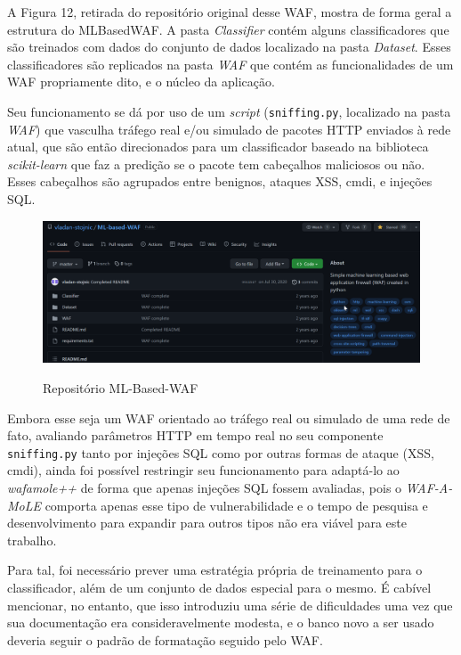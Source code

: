 A Figura 12, retirada do repositório original desse WAF, mostra de forma geral a estrutura do MLBasedWAF. A pasta \textit{Classifier} contém alguns classificadores que são treinados com dados do conjunto de dados localizado na pasta \textit{Dataset}. Esses classificadores são replicados na pasta \textit{WAF} que contém as funcionalidades de um WAF propriamente dito, e o núcleo da aplicação.

Seu funcionamento se dá por uso de um \textit{script} (\verb+sniffing.py+, localizado na pasta \textit{WAF}) que vasculha tráfego real e/ou simulado de pacotes HTTP enviados à rede atual, que são então direcionados para um classificador baseado na biblioteca \textit{scikit-learn} que faz a predição se o pacote tem cabeçalhos maliciosos ou não. Esses cabeçalhos são agrupados entre benignos, ataques XSS, cmdi, e injeções SQL.

\begin{figure}[ht]
    \centering
    \caption{Repositório ML-Based-WAF}
    \includegraphics[width=16cm]{figuras/MLBasedWAF.png} 
    \label{fig:internet} 
\end{figure}

Embora esse seja um WAF orientado ao tráfego real ou simulado de uma rede de fato, avaliando parâmetros HTTP em tempo real no seu componente \verb+sniffing.py+ tanto por injeções SQL como por outras formas de ataque (XSS, cmdi), ainda foi possível restringir seu funcionamento para adaptá-lo ao \textit{wafamole++} de forma que apenas injeções SQL fossem avaliadas, pois o \textit{WAF-A-MoLE} comporta apenas esse tipo de vulnerabilidade e o tempo de pesquisa e desenvolvimento para expandir para outros tipos não era viável para este trabalho.

Para tal, foi necessário prever uma estratégia própria de treinamento para o classificador, além de um conjunto de dados especial para o mesmo. É cabível mencionar, no entanto, que isso introduziu uma série de dificuldades uma vez que sua documentação era consideravelmente modesta, e o banco novo a ser usado deveria seguir o padrão de formatação seguido pelo WAF.


